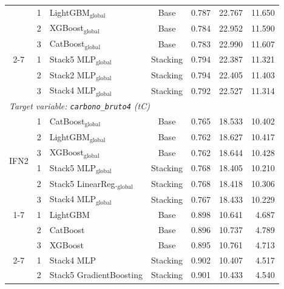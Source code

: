 \begin{table}[htbp]
\begin{tabular}{cclcrrr}
            & 1 & LightGBM$_{\text{global}}$             & Base     & 0.787 & 22.767 & 11.650 \\
            & 2 & XGBoost$_{\text{global}}$              & Base     & 0.784 & 22.952 & 11.590 \\
            & 3 & CatBoost$_{\text{global}}$             & Base     & 0.783 & 22.990 & 11.607 \\
        \cmidrule{2-7}
            & 1 & Stack5 MLP$_{\text{global}}$           & Stacking & 0.794 & 22.387 & 11.321 \\
            & 2 & Stack2 MLP$_{\text{global}}$           & Stacking & 0.794 & 22.405 & 11.403 \\
            & 3 & Stack4 MLP$_{\text{global}}$           & Stacking & 0.792 & 22.527 & 11.314 \\
        \midrule
        \multicolumn{7}{l}{\textit{Target variable: \texttt{carbono\_bruto4} (tC)}} \\
        \midrule
        \multirow{6}{*}{IFN2}
            & 1 & CatBoost$_{\text{global}}$             & Base     & 0.765 & 18.533 & 10.402 \\
            & 2 & LightGBM$_{\text{global}}$             & Base     & 0.762 & 18.627 & 10.417 \\
            & 3 & XGBoost$_{\text{global}}$              & Base     & 0.762 & 18.644 & 10.428 \\
        \cmidrule{2-7}
            & 1 & Stack5 MLP$_{\text{global}}$           & Stacking & 0.768 & 18.405 & 10.210 \\
            & 2 & Stack5 LinearReg.$_{\text{global}}$      & Stacking & 0.768 & 18.418 & 10.306 \\
            & 3 & Stack4 MLP$_{\text{global}}$           & Stacking & 0.767 & 18.433 & 10.229 \\
        \cmidrule{1-7}
        \multirow{6}{*}{IFN3}
            & 1 & LightGBM                               & Base     & 0.898 & 10.641 &  4.687 \\
            & 2 & CatBoost                               & Base     & 0.896 & 10.737 &  4.789 \\
            & 3 & XGBoost                                & Base     & 0.895 & 10.761 &  4.713 \\
        \cmidrule{2-7}
            & 1 & Stack4 MLP                             & Stacking & 0.902 & 10.407 &  4.517 \\
            & 2 & Stack5 GradientBoosting                & Stacking & 0.901 & 10.433 &  4.540 \\

\end{tabular}
\end{table}
